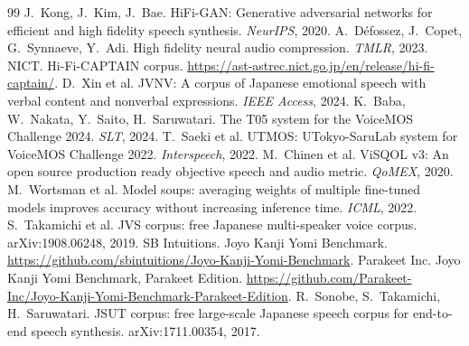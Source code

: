 \documentclass[10pt,a4paper,twocolumn]{article}
\begin{document}
\begin{thebibliography}{99}
 J.~Kong, J.~Kim, J.~Bae. HiFi-GAN: Generative adversarial networks for efficient
and high fidelity speech synthesis. \emph{NeurIPS}, 2020.
 A.~Défossez, J.~Copet, G.~Synnaeve, Y.~Adi. High fidelity neural audio
compression. \emph{TMLR}, 2023.
 NICT. Hi-Fi-CAPTAIN corpus.
\url{https://ast-astrec.nict.go.jp/en/release/hi-fi-captain/}.
 D.~Xin et al. JVNV: A corpus of Japanese emotional speech with verbal content and
nonverbal expressions. \emph{IEEE Access}, 2024.
 K.~Baba, W.~Nakata, Y.~Saito, H.~Saruwatari. The T05 system for the VoiceMOS
Challenge 2024. \emph{SLT}, 2024.
 T.~Saeki et al. UTMOS: UTokyo-SaruLab system for VoiceMOS Challenge 2022.
\emph{Interspeech}, 2022.
 M.~Chinen et al. ViSQOL v3: An open source production ready objective speech and
audio metric. \emph{QoMEX}, 2020.
 M.~Wortsman et al. Model soups: averaging weights of multiple fine-tuned models
improves accuracy without increasing inference time. \emph{ICML}, 2022.
 S.~Takamichi et al. JVS corpus: free Japanese multi-speaker voice corpus.
arXiv:1908.06248, 2019.
 SB Intuitions. Joyo Kanji Yomi Benchmark.
\url{https://github.com/sbintuitions/Joyo-Kanji-Yomi-Benchmark}.
 Parakeet Inc. Joyo Kanji Yomi Benchmark, Parakeet Edition.
\url{https://github.com/Parakeet-Inc/Joyo-Kanji-Yomi-Benchmark-Parakeet-Edition}.
 R.~Sonobe, S.~Takamichi, H.~Saruwatari. JSUT corpus: free large-scale Japanese
speech corpus for end-to-end speech synthesis. arXiv:1711.00354, 2017.
\end{thebibliography}
\end{document}
